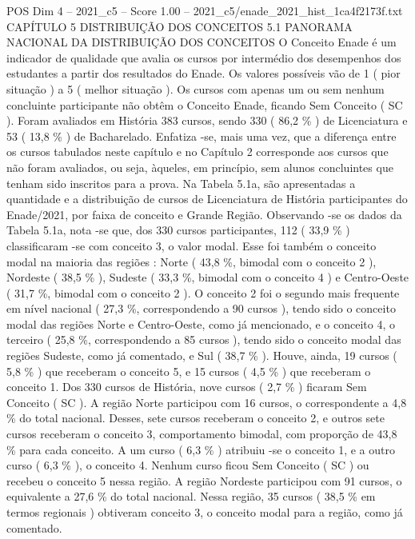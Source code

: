 \begin{textsample}{POS Dim 4 – 2021\_c5 – Score 1.00 – 2021\_c5/enade\_2021\_hist\_1ca4f2173f.txt}  \label{ex:f4_pos_218}
CAPÍTULO 5 DISTRIBUIÇÃO DOS CONCEITOS 5.1 PANORAMA NACIONAL DA DISTRIBUIÇÃO DOS CONCEITOS O Conceito Enade é um indicador de qualidade que avalia os cursos por intermédio dos desempenhos dos estudantes a partir dos resultados do Enade.
Os valores possíveis vão de 1 ( pior situação ) a 5 ( melhor situação ).
Os cursos com apenas um ou sem nenhum concluinte participante não obtêm o Conceito Enade, ficando Sem Conceito ( SC ).
Foram avaliados em História 383 cursos, sendo 330 ( 86,2 \% ) de Licenciatura e 53 ( 13,8 \% ) de Bacharelado.
Enfatiza -se, mais uma vez, que a diferença entre os cursos tabulados neste capítulo e no Capítulo 2 corresponde aos cursos que não foram avaliados, ou seja, àqueles, em princípio, sem alunos concluintes que tenham sido inscritos para a prova.
Na Tabela 5.1a, são apresentadas a quantidade e a distribuição de cursos de Licenciatura de História participantes do Enade/2021, por faixa de conceito e Grande Região.
Observando -se os dados da Tabela 5.1a, nota -se que, dos 330 cursos participantes, 112 ( 33,9 \% ) classificaram -se com conceito 3, o valor modal.
Esse foi também o conceito modal na maioria das regiões : Norte ( 43,8 \%, bimodal com o conceito 2 ), Nordeste ( 38,5 \% ), Sudeste ( 33,3 \%, bimodal com o conceito 4 ) e Centro-Oeste ( 31,7 \%, bimodal com o conceito 2 ).
O conceito 2 foi o segundo mais frequente em nível nacional ( 27,3 \%, correspondendo a 90 cursos ), tendo sido o conceito modal das regiões Norte e Centro-Oeste, como já mencionado, e o conceito 4, o terceiro ( 25,8 \%, correspondendo a 85 cursos ), tendo sido o conceito modal das regiões Sudeste, como já comentado, e Sul ( 38,7 \% ).
Houve, ainda, 19 cursos ( 5,8 \% ) que receberam o conceito 5, e 15 cursos ( 4,5 \% ) que receberam o conceito 1.
Dos 330 cursos de História, nove cursos ( 2,7 \% ) ficaram Sem Conceito ( SC ).
A região Norte participou com 16 cursos, o correspondente a 4,8 \% do total nacional.
Desses, sete cursos receberam o conceito 2, e outros sete cursos receberam o conceito 3, comportamento bimodal, com proporção de 43,8 \% para cada conceito.
A um curso ( 6,3 \% ) atribuiu -se o conceito 1, e a outro curso ( 6,3 \% ), o conceito 4.
Nenhum curso ficou Sem Conceito ( SC ) ou recebeu o conceito 5 nessa região.
A região Nordeste participou com 91 cursos, o equivalente a 27,6 \% do total nacional.
Nessa região, 35 cursos ( 38,5 \% em termos regionais ) obtiveram conceito 3, o conceito modal para a região, como já comentado.

\end{textsample}
